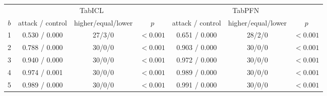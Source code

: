 \centering\footnotesize\setlength{\tabcolsep}{4pt}\begin{tabular}{@{}ccccccc@{}}\toprule
 & \multicolumn{3}{c}{TabICL} & \multicolumn{3}{c}{TabPFN} \\ \cmidrule(lr){2-4}\cmidrule(l){5-7}
$b$ & attack / control & higher/equal/lower & $p$ & attack / control & higher/equal/lower & $p$ \\ \midrule
1 & 0.530 / 0.000 & 27/3/0 & $<0.001$ & 0.651 / 0.000 & 28/2/0 & $<0.001$ \\
2 & 0.788 / 0.000 & 30/0/0 & $<0.001$ & 0.903 / 0.000 & 30/0/0 & $<0.001$ \\
3 & 0.940 / 0.000 & 30/0/0 & $<0.001$ & 0.972 / 0.000 & 30/0/0 & $<0.001$ \\
4 & 0.974 / 0.001 & 30/0/0 & $<0.001$ & 0.989 / 0.000 & 30/0/0 & $<0.001$ \\
5 & 0.989 / 0.000 & 30/0/0 & $<0.001$ & 0.991 / 0.000 & 30/0/0 & $<0.001$ \\
\bottomrule\end{tabular}
